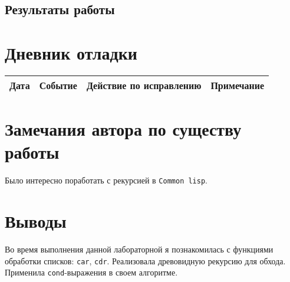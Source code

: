 \documentclass[12pt]{article}
\begin{document}
\subsection{Результаты работы}


\section{Дневник отладки}
\begin{tabular}{|c|c|c|c|}
\hline
Дата & Событие & Действие по исправлению & Примечание \\
\hline
\end{tabular}

\section{Замечания автора по существу работы}
Было интересно поработать с рекурсией в {\tt Common lisp}.

\section{Выводы}
Во время выполнения данной лабораторной я познакомилась с функциями обработки списков: {\tt car}, {\tt cdr}. Реализовала древовидную рекурсию для обхода. Применила {\tt сond}-выражения в своем алгоритме.
\end{document}
